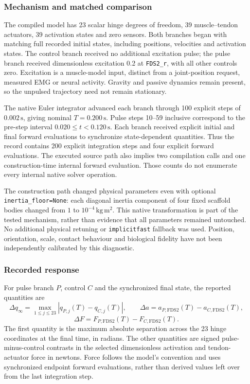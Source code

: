 \subsubsection{Mechanism and matched comparison}

The compiled model has 23 scalar hinge degrees of freedom, 39 muscle--tendon actuators, 39 activation states and zero sensors. Both branches began with matching full recorded initial states, including positions, velocities and activation states. The control branch received no additional excitation pulse; the pulse branch received dimensionless excitation 0.2 at \texttt{FDS2\_r}, with all other controls zero. Excitation is a muscle-model input, distinct from a joint-position request, measured EMG or neural activity. Gravity and passive dynamics remain present, so the unpulsed trajectory need not remain stationary.

The native Euler integrator advanced each branch through 100 explicit steps of $0.002\,\mathrm{s}$, giving nominal $T=0.200\,\mathrm{s}$. Pulse steps 10--59 inclusive correspond to the pre-step interval $0.020\leq t<0.120\,\mathrm{s}$. Each branch received explicit initial and final forward evaluations to synchronize state-dependent quantities. Thus the record contains 200 explicit integration steps and four explicit forward evaluations. The executed source path also implies two compilation calls and one construction-time internal forward evaluation. Those counts do not enumerate every internal native solver operation.

The construction path changed physical parameters even with optional \texttt{inertia\_floor=None}: each diagonal inertia component of four fixed scaffold bodies changed from $1$ to $10^{-4}\,\mathrm{kg\,m^2}$. This native transformation is part of the tested mechanism, rather than evidence that all parameters remained untouched. No additional physical retuning or \texttt{implicitfast} fallback was used. Position, orientation, scale, contact behaviour and biological fidelity have not been independently calibrated by this diagnostic.

\subsubsection{Recorded response}

For pulse branch $P$, control $C$ and the synchronized final state, the reported quantities are
\[
\Delta q_{\infty}=\max_{1\leq j\leq23}|q_{P,j}(T)-q_{C,j}(T)|,
\qquad
\Delta a=a_{P,\mathrm{FDS2}}(T)-a_{C,\mathrm{FDS2}}(T),
\]
\[
\Delta F=F_{P,\mathrm{FDS2}}(T)-F_{C,\mathrm{FDS2}}(T).
\]
The first quantity is the maximum absolute separation across the 23 hinge coordinates at the final time, in radians. The other quantities are signed pulse-minus-control contrasts in the selected dimensionless activation and tendon-actuator force in newtons. Force follows the model's convention and uses synchronized endpoint forward evaluations, rather than derived values left over from the last integration step.

